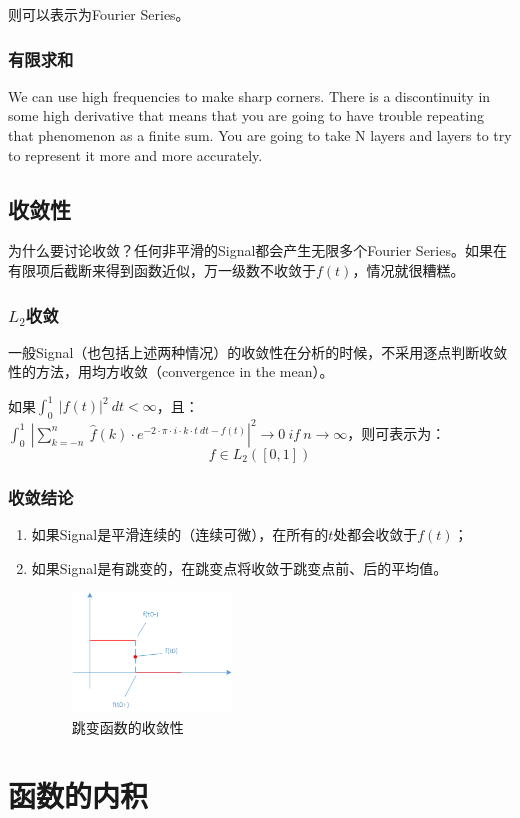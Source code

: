 则可以表示为Fourier Series。
\subsubsection{有限求和}
We can use high frequencies to make sharp corners. There is a discontinuity in some high derivative that means that you are going to have trouble repeating that phenomenon as a finite sum. You are going to take N layers and layers to try to represent it more and more accurately.
\subsection{收敛性}
为什么要讨论收敛？任何非平滑的Signal都会产生无限多个Fourier Series。如果在有限项后截断来得到函数近似，万一级数不收敛于$f(t)$，情况就很糟糕。
\subsubsection{$L_2$收敛}
一般Signal（也包括上述两种情况）的收敛性在分析的时候，不采用逐点判断收敛性的方法，用均方收敛（convergence in the mean）。

如果$\int_{0}^{1}\ |f(t)|^2\ dt<\infty$，且：$\int_{0}^{1}\ |\sum\limits_{k=-n}^{n}\ \hat{f}(k)\cdot e^{-2\cdot \pi\cdot i\cdot k\cdot t\ dt-f(t)}|^2\rightarrow 0\ if\ n\rightarrow \infty$，则可表示为：
$$
	f\in L_2([0,1])
$$
\subsubsection{收敛结论}
\begin{enumerate}
	\item 如果Signal是平滑连续的（连续可微），在所有的$t$处都会收敛于$f(t)$；
	\item 如果Signal是有跳变的，在跳变点将收敛于跳变点前、后的平均值。
	      \begin{figure}[H]
		      \centering
		      \includegraphics[width=0.4\textwidth]{assets/convergence.png}
		      \caption{跳变函数的收敛性}
	      \end{figure}
\end{enumerate}
\section{函数的内积}
